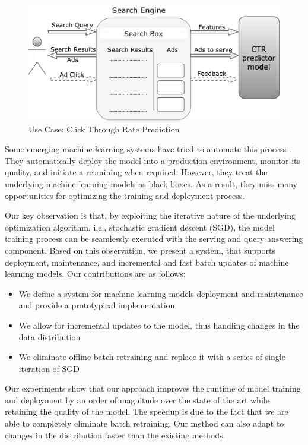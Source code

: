 \documentclass{vldb}
\begin{document}
\begin{figure}[h]
\centering
\includegraphics[width=\columnwidth]{../images/use-case-final.pdf}
\caption{Use Case: Click Through Rate Prediction}
\label{fig:click-rate}
\end{figure}

Some emerging machine learning systems have tried to automate this process \cite{crankshaw2014missing}.
They automatically deploy the model into a production environment, monitor its quality, and initiate a retraining when required.
However, they treat the underlying machine learning models as black boxes. 
As a result, they miss many opportunities for optimizing the training and deployment process.

Our key observation is that, by exploiting the iterative nature of the underlying optimization algorithm, i.e., stochastic gradient descent (SGD), the model training process can be seamlessly executed with the serving and query answering component.
Based on this observation, we present a system, that supports deployment, maintenance, and incremental and fast batch updates of machine learning models.
Our contributions are as follows:
\begin{itemize}
\item We define a system for machine learning models deployment and maintenance and provide a prototypical implementation
\item We allow for incremental updates to the model, thus handling changes in the data distribution
\item We eliminate offline batch retraining and replace it with a series of single iteration of SGD
\end{itemize}
Our experiments show that our approach improves the runtime of model training and deployment by an order of magnitude over the state of the art while retaining the quality of the model. 
The speedup is due to the fact that we are able to completely eliminate batch retraining. 
Our method can also adapt to changes in the distribution faster than the existing methods.
\end{document}
